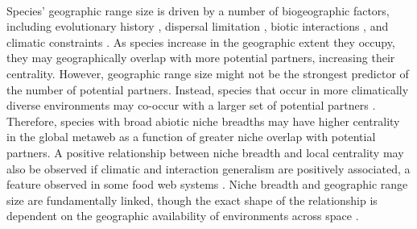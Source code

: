\paragraph*{}
Species' geographic range size is driven by a number of biogeographic factors, including evolutionary history \parencite{webb2000geographic, alzate2025evolutionary}, dispersal limitation \parencite{alzate2022understanding}, biotic interactions \parencite{pigot2013species,galiana2023climate}, and climatic constraints \parencite{hausharter2023niche}. As species increase in the geographic extent they occupy, they may geographically overlap with more potential partners, increasing their centrality. However, geographic range size might not be the strongest predictor of the number of potential partners. Instead, species that occur in more climatically diverse environments may co-occur with a larger set of potential partners \parencite{slatyer2013niche, batstone2018using}. Therefore, species with broad abiotic niche breadths may have higher centrality in the global metaweb as a function of greater niche overlap with potential partners. A positive relationship between niche breadth and local centrality may also be observed if climatic and interaction generalism are positively associated, a feature observed in some food web systems \parencite{slatyer2013niche}. Niche breadth and geographic range size are fundamentally linked, though the exact shape of the relationship is dependent on the geographic availability of environments across space \parencite{dallas2025linking}.



